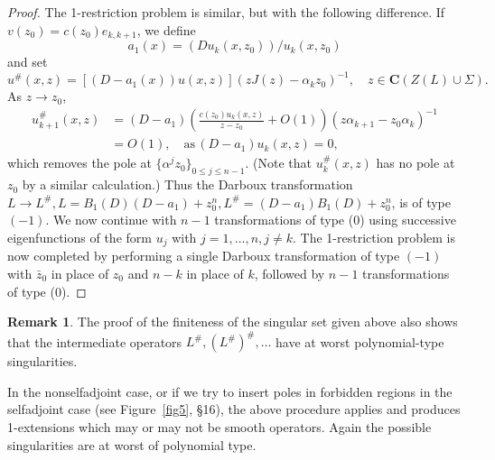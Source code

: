 \documentclass{surv-l}
\theoremstyle{plain}
\theoremstyle{definition}
\newtheorem{remark}[theorem]{Remark}
\numberwithin{equation}{chapter}
\begin{document}
\begin{proof}
The 1-restriction problem is similar, but with the following difference. If $v(z_{0})=c(z_{0})e_{k,k+1}$, we define
\begin{equation}\label{eq37.48}
a_{1}(x)=(Du_{k}(x, z_{0}))/u_{k}(x, z_{0})
\end{equation}
and set
\begin{equation*}
u^{\#}(x, z)=[(D-a_{1}(x))u(x, z)](zJ(z)-\alpha_{k}z_{0})^{-1}, \quad z\in \mathrm{\textbf{C}}(Z(L)\cup\Sigma).
\end{equation*}
As $z\rightarrow z_{0}$,
\begin{align*}
u_{k+1}^{\#}(x, z)&=(D-a_{1})\left(\frac{c(z_{0})u_{k}(x,z)}{z-z_{0}}+O(1)\right)(z\alpha_{k+1}-z_{0}\alpha_{k})^{-1} \\
&=O(1),\quad \mathrm{as}\,(D-a_{1})u_{k}(x, z)=0,
\end{align*}
which removes the pole at $\{\alpha^{j}z_{0}\}_{0\leq j\leq n-1}$. (Note that $u_{k}^{\#}(x, z)$ has no pole at $z_{0}$ by a similar calculation.) Thus the Darboux transformation $ L\rightarrow L^{\#}, L=B_{1}(D)(D-a_{1}) + z_{0}^{n}, L^{\#}=(D-a_{1})B_{1}(D)+z_{0}^{n}$, is of type $(-1)$. We now continue with $n-1$ transformations of type (0) using successive eigenfunctions of the form $u_{j}$ with $j=1,\ldots,n, j\neq k$. The 1-restriction problem is now completed by performing a single Darboux transformation of type $(-1)$ with $\bar{z}_{0}$ in place of $z_{0}$ and $n-k$ in place of $k$, followed by $n-1$ transformations of type (0).
\end{proof}

\setcounter{theorem}{48}
\begin{remark}\label{rem37.49}
The proof of the finiteness of the singular set given above also shows that the intermediate operators $ L^{\#}, (L^{\#})^{\#},\ldots $ have at worst polynomial-type singularities.
\end{remark}

In the nonselfadjoint case, or if we try to insert poles in forbidden regions in the selfadjoint case (see Figure~\ref{fig5}, \S 16), the above procedure applies and produces 1-extensions which may or may not be smooth operators. Again the possible singularities are at worst of polynomial type.
\end{document}
